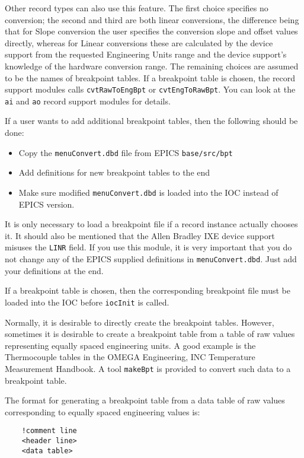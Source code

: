 Other record types can also use this feature.
The first choice specifies no conversion; the second and third are both linear conversions, the difference being that for Slope conversion the user specifies the conversion slope and offset values directly, whereas for Linear conversions these are calculated by the device support from the requested Engineering Units range and the device support's knowledge of the hardware conversion range.
The remaining choices are assumed to be the names of breakpoint tables.
If a breakpoint table is chosen, the record support modules calls \verb|cvtRawToEngBpt| or \verb|cvtEngToRawBpt|.
You can look at the \verb|ai| and \verb|ao| record support modules for details.

If a user wants to add additional breakpoint tables, then the following should be done:

\begin{itemize}
\item Copy the \verb|menuConvert.dbd| file from EPICS \verb|base/src/bpt|
\item Add definitions for new breakpoint tables to the end
\item Make sure modified \verb|menuConvert.dbd| is loaded  into the IOC instead of EPICS version.
\end{itemize}

It is only necessary to load a breakpoint file if a record instance actually chooses it.
It should also be mentioned that the Allen Bradley IXE device support misuses the \verb|LINR| field.
If you use this module, it is very important that you do not change any of the EPICS supplied definitions in \verb|menuConvert.dbd|.
Just add your definitions at the end.

If a breakpoint table is chosen, then the corresponding breakpoint file must be loaded into the IOC before \verb|iocInit| is called.

Normally, it is desirable to directly create the breakpoint tables.
However, sometimes it is desirable to create a breakpoint table from a table of raw values representing equally spaced engineering units.
A good example is the Thermocouple tables in the OMEGA Engineering, INC Temperature Measurement Handbook.
A tool \verb|makeBpt| is provided to convert such data to a breakpoint table.

The format for generating a breakpoint table from a data table of raw values corresponding to equally spaced engineering values is:

\begin{verbatim}
    !comment line
    <header line>
    <data table>
\end{verbatim}

